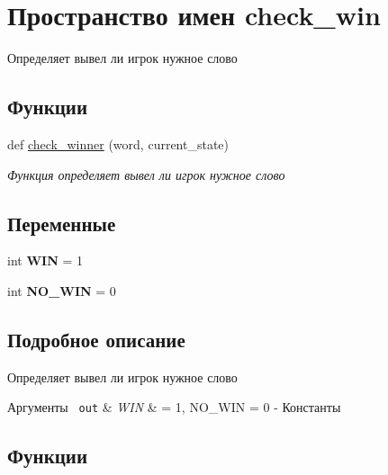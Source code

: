 \hypertarget{namespacecheck__win}{}\section{Пространство имен check\+\_\+win}
\label{namespacecheck__win}


Определяет вывел ли игрок нужное слово  


\subsection*{Функции}
\begin{DoxyCompactItemize}
\item 
def \mbox{\hyperlink{namespacecheck__win_a757d157c2cf10408dc34ae9e82a7c7f4}{check\+\_\+winner}} (word, current\+\_\+state)
\begin{DoxyCompactList}\small\item\em Функция определяет вывел ли игрок нужное слово \end{DoxyCompactList}\end{DoxyCompactItemize}
\subsection*{Переменные}
\begin{DoxyCompactItemize}
\item 
\mbox{\label{namespacecheck__win_aff4aaf4bd4dd9e77e7f48195da6ddce4}} 
int {\bfseries W\+IN} = 1
\item 
\mbox{\label{namespacecheck__win_a7b9444c7b49fe75ebc0b0a94b9065015}} 
int {\bfseries N\+O\+\_\+\+W\+IN} = 0
\end{DoxyCompactItemize}


\subsection{Подробное описание}
Определяет вывел ли игрок нужное слово 


\begin{DoxyParams}[1]{Аргументы}
\mbox{\texttt{ out}}  & {\em W\+IN} & = 1, N\+O\+\_\+\+W\+IN = 0 -\/ Константы \\
\hline
\end{DoxyParams}


\subsection{Функции}
\mbox{\label{namespacecheck__win_a757d157c2cf10408dc34ae9e82a7c7f4}} 

